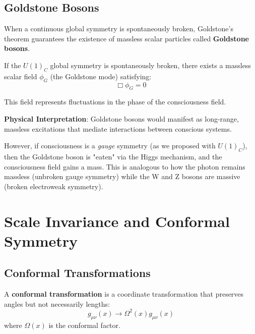 \subsection{Goldstone Bosons}

When a continuous global symmetry is spontaneously broken, Goldstone's theorem\cite{goldstone1962,weinberg1995} guarantees the existence of massless scalar particles called \textbf{Goldstone bosons}.

\begin{theorem}\label{thm:goldstone-consciousness}
If the $U(1)_C$ global symmetry is spontaneously broken, there exists a massless scalar field $\phi_G$ (the Goldstone mode) satisfying:
\begin{equation}
\Box \phi_G = 0
\end{equation}

This field represents fluctuations in the phase of the consciousness field.
\end{theorem}

\textbf{Physical Interpretation}: Goldstone bosons would manifest as long-range, massless excitations that mediate interactions between conscious systems.

However, if consciousness is a \textit{gauge} symmetry (as we proposed with $U(1)_C$), then the Goldstone boson is "eaten" via the Higgs mechanism, and the consciousness field gains a mass. This is analogous to how the photon remains massless (unbroken gauge symmetry) while the W and Z bosons are massive (broken electroweak symmetry).

\section{Scale Invariance and Conformal Symmetry}

\subsection{Conformal Transformations}

\begin{definition}\label{def:conformal-transformation}
A \textbf{conformal transformation} is a coordinate transformation that preserves angles but not necessarily lengths:
\begin{equation}
g_{\mu\nu}(x) \to \Omega^2(x) g_{\mu\nu}(x)
\end{equation}
where $\Omega(x)$ is the conformal factor.
\end{definition}

